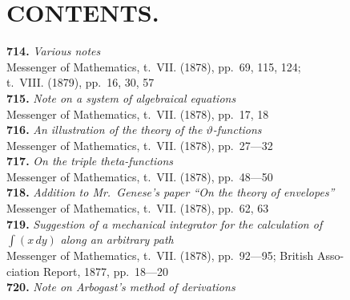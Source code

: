 \documentclass[12pt,a4paper,oneside]{book}
\theoremstyle{plain}
\theoremstyle{definition}
\theoremstyle{remark}
\begin{document}
\cleardoublepage

\chapter*{CONTENTS.}

\textbf{714.} \textit{Various notes} \\
\hspace*{2em}Messenger of Mathematics, t.~VII. (1878), pp.~69, 115, 124;\\
\hspace*{2em}t.~VIII. (1879), pp.~16, 30, 57\\[0.3em]
\textbf{715.} \textit{Note on a system of algebraical equations} \\
\hspace*{2em}Messenger of Mathematics, t.~VII. (1878), pp.~17, 18\\[0.3em]
\textbf{716.} \textit{An illustration of the theory of the $\vartheta$-functions} \\
\hspace*{2em}Messenger of Mathematics, t.~VII. (1878), pp.~27---32\\[0.3em]
\textbf{717.} \textit{On the triple theta-functions} \\
\hspace*{2em}Messenger of Mathematics, t.~VII. (1878), pp.~48---50\\[0.3em]
\textbf{718.} \textit{Addition to Mr.~Genese's paper ``On the theory of envelopes''} \\
\hspace*{2em}Messenger of Mathematics, t.~VII. (1878), pp.~62, 63\\[0.3em]
\textbf{719.} \textit{Suggestion of a mechanical integrator for the calculation of}\\
\hspace*{2em}$\int(x\,dy)$ \textit{along an arbitrary path} \\
\hspace*{2em}Messenger of Mathematics, t.~VII. (1878), pp.~92---95; British Asso-\\
\hspace*{2em}ciation Report, 1877, pp.~18---20\\[0.3em]
\textbf{720.} \textit{Note on Arbogast's method of derivations} \\
\end{document}
